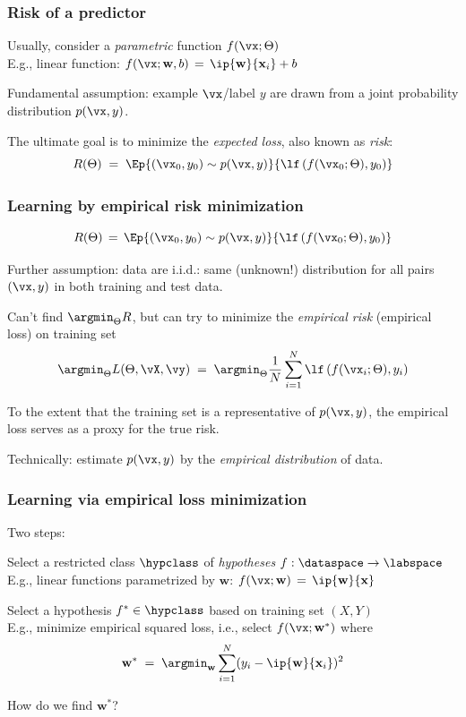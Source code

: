 \documentclass[xcolor=dvipsnames]{beamer}
\begin{document}
\begin{frame}\frametitle{Risk of a predictor}
\bi
\item Usually, consider a \emph{parametric} function $f(\vx;\Theta)$\\
E.g., linear function: $f(\vx;\mathbf{w},b)\,=\,\ip{\mathbf{w}}{\mathbf{x}_i}+b$
\item Fundamental assumption:
  example $\vx$/label $y$ are drawn from a joint probability
  distribution $p(\vx,y)$.
\item The ultimate goal is to minimize the \emph{expected loss}, also
  known as \emph{risk}:
\[R(\Theta)\;=\;\Ep{(\vx_0,y_0)\sim p(\vx,y)}{\lf\left(f(\vx_0;\Theta),y_0\right)}\]
\ei



\end{frame}


\begin{frame}\frametitle{Learning by empirical risk minimization} 
\[R(\Theta)\,=\,\Ep{(\vx_0,y_0)\sim p(\vx,y)}{\lf\left(f(\vx_0;\Theta),y_0\right)}\]

\bi
\item Further assumption: data are i.i.d.: same (unknown!) distribution for all pairs $(\vx,y)$
  in both training and test data.
\item Can't find $\argmin_{\Theta}R$, but can try to minimize the \emph{empirical risk}
  (empirical loss) on training set
\[\argmin_{\Theta}L(\Theta,\vX,\vy)\;=\;\argmin_{\Theta}\frac{1}{N}\sum_{i=1}^N\lf\left(f(\vx_i;\Theta),y_i\right)\]
\item To the extent that the training set is a representative of $p(\vx,y)$, the empirical loss serves as a
  proxy for the true risk. 
\item Technically: estimate $p(\vx,y)$ by the \emph{empirical
    distribution} of data.
\ei
\end{frame}





\begin{frame}\frametitle{Learning via empirical loss minimization}
Two steps:
\bi
\item Select a restricted class $\hypclass$ of
  \emph{hypotheses} $f:\dataspace\to\labspace$ \\
E.g., linear functions parametrized by $\mathbf{w}$:
  $f(\vx;\mathbf{w})\,=\,\ip{\mathbf{w}}{\mathbf{x}}$

\item Select a hypothesis $f^\ast\in\hypclass$ based
  on training set $(X,Y)$\\
E.g., minimize empirical squared loss, i.e., select $f(\vx;\mathbf{w}^\ast)$ where
\[\mathbf{w}^\ast\;=\;\argmin_{\mathbf{w}}\sum_{i=1}^N(y_i-\ip{\mathbf{w}}{\mathbf{x}_i})^2\]
\item How do we find $\mathbf{w}^\ast$?
\ei


\end{frame}
\end{document}
